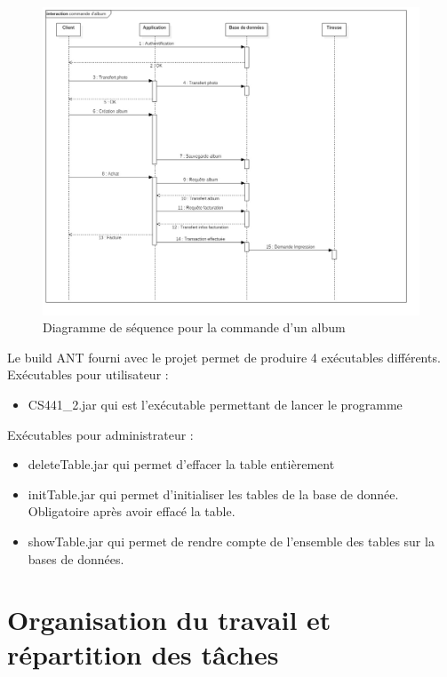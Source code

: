 \documentclass{article}
\begin{document}
\begin{flushleft}
\vspace{1\baselineskip}
\begin{figure}[!h]
  \begin{center}
    \includegraphics[scale=0.40]{fig8} %
    \caption{Diagramme de séquence pour la commande d'un album}
  \end{center}
\end{figure}

Le build ANT fourni avec le projet permet de produire 4 exécutables
différents.\\
Exécutables pour utilisateur : \\
\begin{itemize}
  \item CS441_2.jar qui est l'exécutable permettant de lancer le programme
\end{itemize}
Exécutables pour administrateur :\\
\begin{itemize}
  \item deleteTable.jar qui permet d’effacer la table entièrement
  \item initTable.jar qui permet d’initialiser les tables de la base de donnée.
  Obligatoire après avoir effacé la table.
  \item showTable.jar qui permet de rendre compte de l’ensemble des tables
  sur la bases de données.
\end{itemize}


\newpage
\section{Organisation du travail et répartition des tâches}


\end{flushleft}
\end{document}
